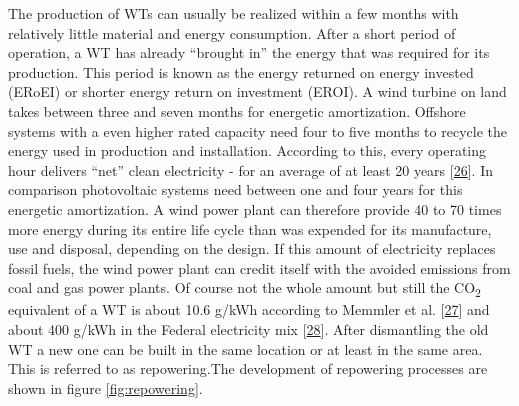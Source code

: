 \documentclass[a4paper,11pt]{article}
\begin{document}
The production of WTs can usually be realized within a few months with relatively little material and energy consumption. After a short period of operation, a WT has already ``brought in'' the energy that was required for its production. This period is known as the energy returned on energy invested (ERoEI) or shorter energy return on investment (EROI). A wind turbine on land takes between three and seven months for energetic amortization. Offshore systems with a even higher rated capacity need four to five months to recycle the energy used in production and installation. According to this, every operating hour delivers ``net'' clean electricity - for an average of at least 20 years {[}\protect\hyperlink{ref-PriyanaRazdan.2019}{26}{]}. In comparison photovoltaic systems need between one and four years for this energetic amortization. A wind power plant can therefore provide 40 to 70 times more energy during its entire life cycle than was expended for its manufacture, use and disposal, depending on the design. If this amount of electricity replaces fossil fuels, the wind power plant can credit itself with the avoided emissions from coal and gas power plants. Of course not the whole amount but still the CO\textsubscript{2} equivalent of a WT is about 10.6 g/kWh according to Memmler et al. {[}\protect\hyperlink{ref-M.MemmlerDr.T.LaufS.Schneider.2017}{27}{]} and about 400 g/kWh in the Federal electricity mix {[}\protect\hyperlink{ref-Umweltbundesamt.2021}{28}{]}. After dismantling the old WT a new one can be built in the same location or at least in the same area. This is referred to as repowering.The development of repowering processes are shown in figure \ref{fig:repowering}.
\end{document}

